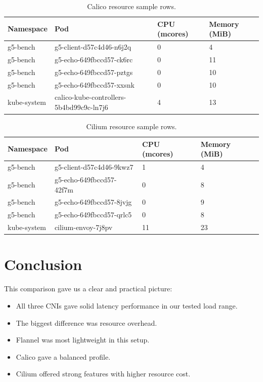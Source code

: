 \documentclass[12pt,a4paper]{article}
\begin{document}
\begin{table}[H]
\centering
\small
\caption{Calico resource sample rows.}
\begin{tabular}{llll}
\toprule
Namespace & Pod & CPU (mcores) & Memory (MiB) \\
\midrule
g5-bench & g5-client-d57c4d46-n6j2q & 0 & 4 \\
g5-bench & g5-echo-649fbccd57-ck6rc & 0 & 11 \\
g5-bench & g5-echo-649fbccd57-pztgs & 0 & 10 \\
g5-bench & g5-echo-649fbccd57-xxsnk & 0 & 10 \\
kube-system & calico-kube-controllers-5b4bd99c9c-ln7j6 & 4 & 13 \\
\bottomrule
\end{tabular}
\end{table}

\begin{table}[H]
\centering
\small
\caption{Cilium resource sample rows.}
\begin{tabular}{llll}
\toprule
Namespace & Pod & CPU (mcores) & Memory (MiB) \\
\midrule
g5-bench & g5-client-d57c4d46-9kwz7 & 1 & 4 \\
g5-bench & g5-echo-649fbccd57-42f7m & 0 & 8 \\
g5-bench & g5-echo-649fbccd57-8jvjg & 0 & 9 \\
g5-bench & g5-echo-649fbccd57-qrlc5 & 0 & 8 \\
kube-system & cilium-envoy-7j8pv & 11 & 23 \\
\bottomrule
\end{tabular}
\end{table}

\section{Conclusion}
This comparison gave us a clear and practical picture:
\begin{itemize}[leftmargin=1.5em]
    \item All three CNIs gave solid latency performance in our tested load range.
    \item The biggest difference was resource overhead.
    \item Flannel was most lightweight in this setup.
    \item Calico gave a balanced profile.
    \item Cilium offered strong features with higher resource cost.
\end{itemize}
\end{document}
